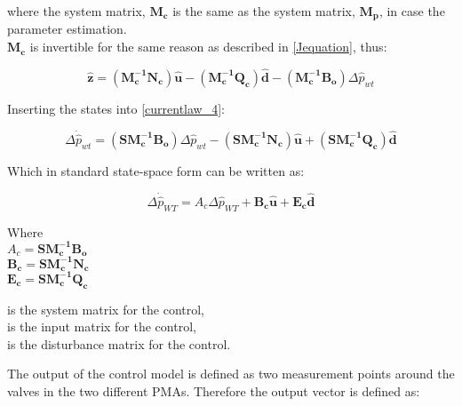 where the system matrix, $\pmb{M_c}$ is the same as the system matrix, $\pmb{M_p}$, in case the parameter estimation. 
\\
$\pmb{M_c}$ is invertible for the same reason as described in \eqref{Jequation}, thus:

 \begin{equation}
 \pmb{\hat{z}} =  (\pmb{M_c^{-1}}\pmb{N_c}) \pmb{\hat{u}} - (\pmb{M_c^{-1}}\pmb{Q_c}) \pmb{\hat{d}} - (\pmb{M_c^{-1}}\pmb{B_o}) \Delta \hat{p}_{wt}    
 \label{statespace_control_sys_state}
\end{equation}

Inserting the states into \eqref{currentlaw_4}:

 \begin{equation}
\Delta \dot{\hat{p}}_{wt} = (\pmb{S}\pmb{M_c^{-1}}\pmb{B_o}) \Delta \hat{p}_{wt}  - (\pmb{S}\pmb{M_c^{-1}}\pmb{N_c}) \pmb{\hat{u}} + (\pmb{S}\pmb{M_c^{-1}}\pmb{Q_c}) \pmb{\hat{d}} 
 \label{statespace_control_sys_state_1}
\end{equation}

Which in standard state-space form can be written as: 

 \begin{equation}
\Delta \dot{\hat{p}}_{WT} = A_c \Delta \hat{p}_{WT}  + \pmb{B_c} \pmb{\hat{u}} + \pmb{E_c} \pmb{\hat{d}} 
 \label{statespace_control_sys_state_2}
\end{equation}

\begin{minipage}[t]{0.40\textwidth}
Where\\
\hspace*{8mm} $A_c = \pmb{S}\pmb{M_c^{-1}}\pmb{B_o} $ \\
\hspace*{8mm} $\pmb{B_c} = \pmb{S}\pmb{M_c^{-1}}\pmb{N_c} $ \\
\hspace*{8mm} $\pmb{E_c} = \pmb{S}\pmb{M_c^{-1}}\pmb{Q_c} $
\end{minipage}
\begin{minipage}[t]{0.48\textwidth}
\vspace*{1mm}
is the system matrix for the control, \\
is the input matrix for the control, \\
is the disturbance matrix for the control.
\end{minipage} 

The output of the control model is defined as two measurement points around the valves in the two different PMAs. Therefore the output vector is defined as: 

